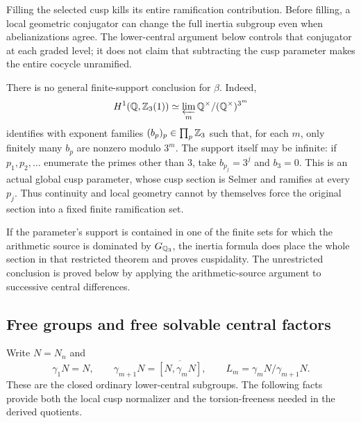 \begin{remark}\label{rem:infinite-support}
Filling the selected cusp kills its entire ramification contribution.
Before filling, a local geometric conjugator can change the full
inertia subgroup even when abelianizations agree. The lower-central
argument below controls that conjugator at each graded level; it does
not claim that subtracting the cusp parameter makes the entire cocycle
unramified.

There is no general finite-support conclusion for $\beta$.
Indeed,
\[
 H^1(\mathbb Q,\mathbb Z_3(1))\simeq
 \varprojlim_m\mathbb Q^\times/(\mathbb Q^\times)^{3^m}
\]
identifies with exponent families $(b_p)_p\in\prod_p\mathbb Z_3$ such that,
for each $m$, only finitely many $b_p$ are nonzero modulo $3^m$.
The support itself may be infinite: if $p_1,p_2,\ldots$ enumerate the
primes other than $3$, take $b_{p_j}=3^j$ and $b_3=0$.
This is an actual global cusp parameter, whose cusp section is Selmer
and ramifies at every $p_j$.  Thus continuity and local geometry cannot
by themselves force the original section into a fixed finite
ramification set.

If the parameter's support is contained in one of the finite sets for
which the arithmetic source is dominated by $G_{\mathbb Q_3}$, the inertia
formula does place the whole section in that restricted theorem and
proves cuspidality.  The unrestricted conclusion is proved below by
applying the arithmetic-source argument to successive central differences.
\end{remark}
\subsection{Free groups and free solvable central factors}
\label{subsec:lm-central-structure}

Write $N=N_n$ and
\[
 \gamma_1N=N,\qquad \gamma_{m+1}N=\overline{[N,\gamma_mN]},
 \qquad L_m=\gamma_mN/\gamma_{m+1}N.
\]
These are the closed ordinary lower-central subgroups.  The following
facts provide both the local cusp normalizer and the torsion-freeness
needed in the derived quotients.

